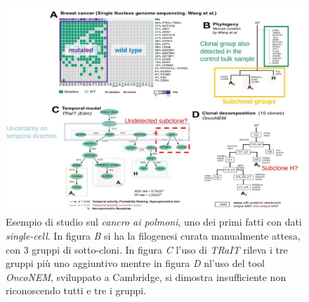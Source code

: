 \documentclass[a4paper,12pt, oneside]{book}
\begin{document}
\begin{figure}
  \centering
  \includegraphics[scale = 1.1]{img/tr2.jpg}
  \caption{Esempio di studio sul \textit{cancro ai polmoni}, uno dei primi fatti
    con dati \textit{single-cell}. In figura \textit{B} si ha la filogenesi
    curata manualmente attesa, con 3 gruppi di sotto-cloni. In figura \textit{C}
    l'uso di \textit{TRaIT} rileva i tre gruppi più uno aggiuntivo mentre in
    figura \textit{D} nl'uso del tool \textit{OncoNEM}, sviluppato a Cambridge,
    si dimostra insufficiente non riconoscendo tutti e tre i gruppi.}  
  \label{fig:tr2}
\end{figure}
\end{document}
